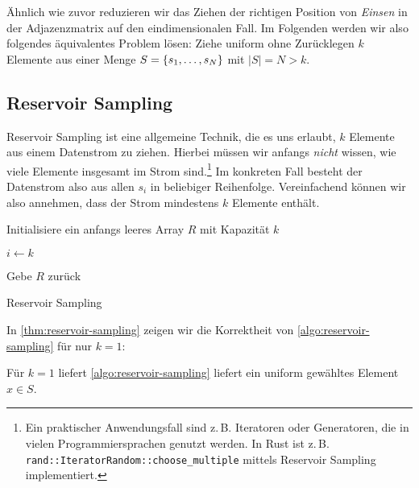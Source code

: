 Ähnlich wie zuvor reduzieren wir das Ziehen der richtigen Position von \emph{Einsen} in der Adjazenzmatrix auf den eindimensionalen Fall.
Im Folgenden werden wir also folgendes äquivalentes Problem lösen:
Ziehe uniform ohne Zurücklegen $k$ Elemente aus einer Menge $S = \left\{s_1, \ldots, s_N\right\}$ mit $|S| = N > k$.

\subsection{Reservoir Sampling}
Reservoir Sampling ist eine allgemeine Technik, die es uns erlaubt, $k$ Elemente aus einem Datenstrom zu ziehen.
Hierbei müssen wir anfangs \emph{nicht} wissen, wie viele Elemente insgesamt im Strom sind.\footnote{
    Ein praktischer Anwendungsfall sind z.\,B. Iteratoren oder Generatoren, die in vielen Programmiersprachen genutzt werden.
    In Rust ist z.\,B. \texttt{rand::IteratorRandom::choose\_multiple} mittels Reservoir Sampling implementiert.
}
Im konkreten Fall besteht der Datenstrom also aus allen $s_i$ in beliebiger Reihenfolge.
Vereinfachend können wir also annehmen, dass der Strom mindestens $k$ Elemente enthält.

\begin{algorithm}[H]

    Initialisiere ein anfangs leeres Array $R$ mit Kapazität $k$\;


    $i \gets k$\;

    Gebe $R$ zurück

    \caption{Reservoir Sampling}
    \label{algo:reservoir-sampling}
\end{algorithm}

\bigskip
\bigskip

\noindent
In \cref{thm:reservoir-sampling} zeigen wir die Korrektheit von \cref{algo:reservoir-sampling} für nur $k = 1$:
\begin{theorem}\label{thm:reservoir-sampling}
    Für $k=1$ liefert \cref{algo:reservoir-sampling} liefert ein uniform gewähltes Element $x\in S$.
\end{theorem}

